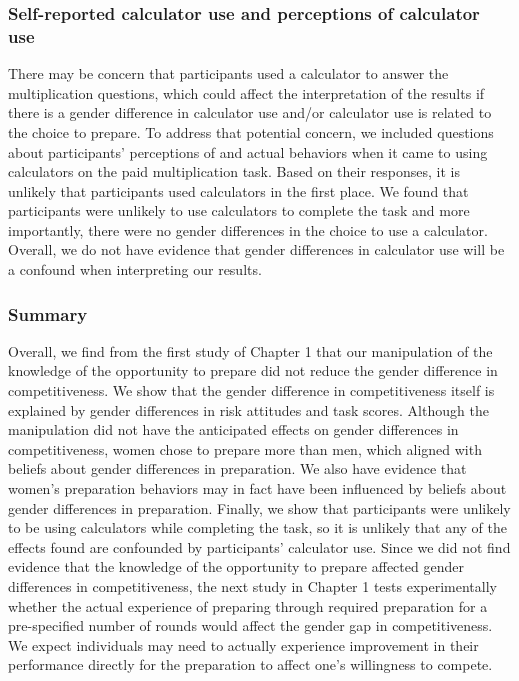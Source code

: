 \documentclass[a4paper, nobind]{templates/ociamthesis}
\begin{document}
\hypertarget{self-reported-calculator-use-and-perceptions-of-calculator-use}{%
\subsubsection{Self-reported calculator use and perceptions of calculator use}\label{self-reported-calculator-use-and-perceptions-of-calculator-use}}

There may be concern that participants used a calculator to answer the multiplication questions, which could affect the interpretation of the results if there is a gender difference in calculator use and/or calculator use is related to the choice to prepare. To address that potential concern, we included questions about participants' perceptions of and actual behaviors when it came to using calculators on the paid multiplication task. Based on their responses, it is unlikely that participants used calculators in the first place. We found that participants were unlikely to use calculators to complete the task and more importantly, there were no gender differences in the choice to use a calculator. Overall, we do not have evidence that gender differences in calculator use will be a confound when interpreting our results.

\hypertarget{summary}{%
\subsubsection{Summary}\label{summary}}

Overall, we find from the first study of Chapter 1 that our manipulation of the knowledge of the opportunity to prepare did not reduce the gender difference in competitiveness. We show that the gender difference in competitiveness itself is explained by gender differences in risk attitudes and task scores. Although the manipulation did not have the anticipated effects on gender differences in competitiveness, women chose to prepare more than men, which aligned with beliefs about gender differences in preparation. We also have evidence that women's preparation behaviors may in fact have been influenced by beliefs about gender differences in preparation. Finally, we show that participants were unlikely to be using calculators while completing the task, so it is unlikely that any of the effects found are confounded by participants' calculator use. Since we did not find evidence that the knowledge of the opportunity to prepare affected gender differences in competitiveness, the next study in Chapter 1 tests experimentally whether the actual experience of preparing through required preparation for a pre-specified number of rounds would affect the gender gap in competitiveness. We expect individuals may need to actually experience improvement in their performance directly for the preparation to affect one's willingness to compete.
\end{document}
